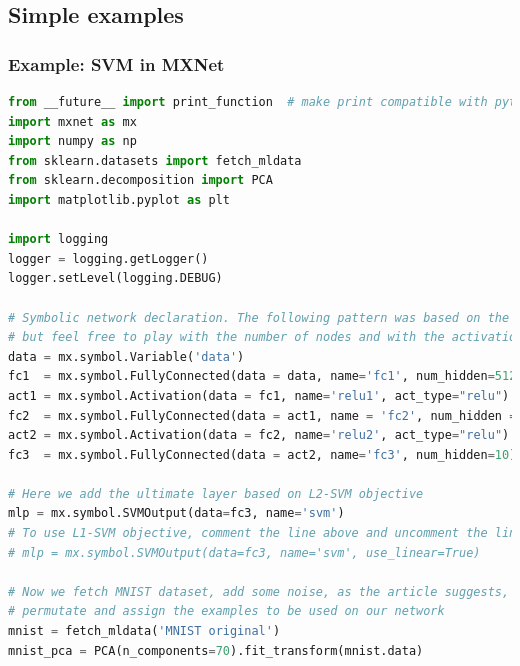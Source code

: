 \subsection{Simple examples}

\begin{frame}[fragile]
  \MyLogo
  \frametitle{Example: SVM in MXNet}  

\begin{lstlisting}[language=python]
from __future__ import print_function  # make print compatible with python 2.x
import mxnet as mx
import numpy as np
from sklearn.datasets import fetch_mldata
from sklearn.decomposition import PCA
import matplotlib.pyplot as plt

import logging
logger = logging.getLogger()
logger.setLevel(logging.DEBUG)

# Symbolic network declaration. The following pattern was based on the article, 
# but feel free to play with the number of nodes and with the activation function
data = mx.symbol.Variable('data')
fc1  = mx.symbol.FullyConnected(data = data, name='fc1', num_hidden=512)
act1 = mx.symbol.Activation(data = fc1, name='relu1', act_type="relu")
fc2  = mx.symbol.FullyConnected(data = act1, name = 'fc2', num_hidden = 512)
act2 = mx.symbol.Activation(data = fc2, name='relu2', act_type="relu")
fc3  = mx.symbol.FullyConnected(data = act2, name='fc3', num_hidden=10)

# Here we add the ultimate layer based on L2-SVM objective
mlp = mx.symbol.SVMOutput(data=fc3, name='svm')
# To use L1-SVM objective, comment the line above and uncomment the line below
# mlp = mx.symbol.SVMOutput(data=fc3, name='svm', use_linear=True)

# Now we fetch MNIST dataset, add some noise, as the article suggests,
# permutate and assign the examples to be used on our network
mnist = fetch_mldata('MNIST original')
mnist_pca = PCA(n_components=70).fit_transform(mnist.data)
\end{lstlisting}

\end{frame}

